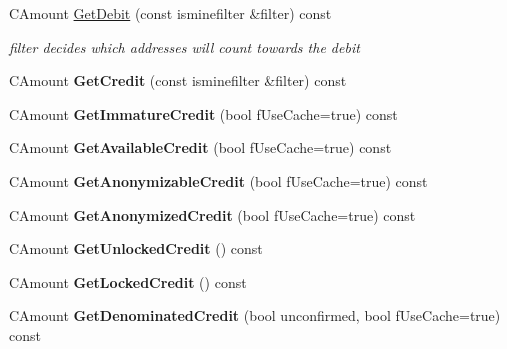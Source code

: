 \begin{DoxyCompactItemize}
\mbox{\label{class_c_wallet_tx_a7757c17a323e5f6f75c92acb398d3568}} 
C\+Amount \mbox{\hyperlink{class_c_wallet_tx_a7757c17a323e5f6f75c92acb398d3568}{Get\+Debit}} (const isminefilter \&filter) const
\begin{DoxyCompactList}\small\item\em filter decides which addresses will count towards the debit \end{DoxyCompactList}\item 
\mbox{\label{class_c_wallet_tx_a176e9ecbafbee27d604acbab9804885d}} 
C\+Amount {\bfseries Get\+Credit} (const isminefilter \&filter) const
\item 
\mbox{\label{class_c_wallet_tx_a19bb617269ab1ce42f5d18e1f1f8db09}} 
C\+Amount {\bfseries Get\+Immature\+Credit} (bool f\+Use\+Cache=true) const
\item 
\mbox{\label{class_c_wallet_tx_af3c82ba365c720dd3d929b86bf432ef6}} 
C\+Amount {\bfseries Get\+Available\+Credit} (bool f\+Use\+Cache=true) const
\item 
\mbox{\label{class_c_wallet_tx_a36141f888e497336898f48274b92cf37}} 
C\+Amount {\bfseries Get\+Anonymizable\+Credit} (bool f\+Use\+Cache=true) const
\item 
\mbox{\label{class_c_wallet_tx_a49cae757845e1bf0cb3c8e17bd96d4a1}} 
C\+Amount {\bfseries Get\+Anonymized\+Credit} (bool f\+Use\+Cache=true) const
\item 
\mbox{\label{class_c_wallet_tx_aaf06deb84a9ed045f0ac40e13685f4f0}} 
C\+Amount {\bfseries Get\+Unlocked\+Credit} () const
\item 
\mbox{\label{class_c_wallet_tx_a910d8a59331797413b3ae71e879249c2}} 
C\+Amount {\bfseries Get\+Locked\+Credit} () const
\item 
\mbox{\label{class_c_wallet_tx_add56840ebbe56702eeddbfda1870d628}} 
C\+Amount {\bfseries Get\+Denominated\+Credit} (bool unconfirmed, bool f\+Use\+Cache=true) const
\item 
\mbox{\label{class_c_wallet_tx_a72f8eabb937fe06b415316c2ef4ea510}} 

\end{DoxyCompactItemize}
